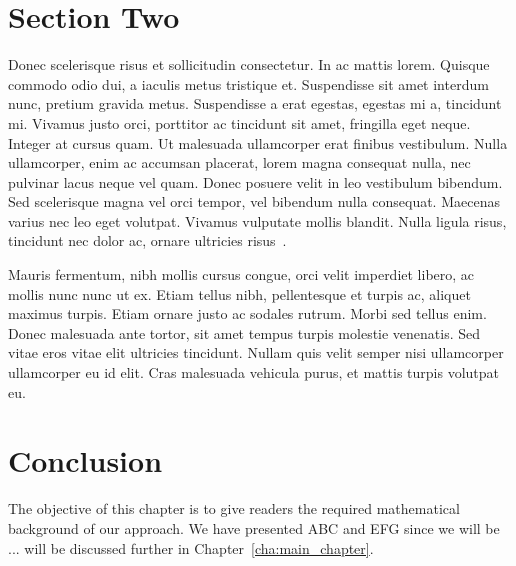 
\section{Section Two}
\label{sec:section_two}

Donec scelerisque risus et sollicitudin consectetur. In ac mattis lorem. Quisque commodo odio dui, a iaculis metus tristique et. Suspendisse sit amet interdum nunc, pretium gravida metus. Suspendisse a erat egestas, egestas mi a, tincidunt mi. Vivamus justo orci, porttitor ac tincidunt sit amet, fringilla eget neque. Integer at cursus quam. Ut malesuada ullamcorper erat finibus vestibulum. Nulla ullamcorper, enim ac accumsan placerat, lorem magna consequat nulla, nec pulvinar lacus neque vel quam. Donec posuere velit in leo vestibulum bibendum. Sed scelerisque magna vel orci tempor, vel bibendum nulla consequat. Maecenas varius nec leo eget volutpat. Vivamus vulputate mollis blandit. Nulla ligula risus, tincidunt nec dolor ac, ornare ultricies risus~\cite{Schmidt1993aa}. \newline

Mauris fermentum, nibh mollis cursus congue, orci velit imperdiet libero, ac mollis nunc nunc ut ex. Etiam tellus nibh, pellentesque et turpis ac, aliquet maximus turpis. Etiam ornare justo ac sodales rutrum. Morbi sed tellus enim. Donec malesuada ante tortor, sit amet tempus turpis molestie venenatis. Sed vitae eros vitae elit ultricies tincidunt. Nullam quis velit semper nisi ullamcorper ullamcorper eu id elit. Cras malesuada vehicula purus, et mattis turpis volutpat eu.



\section{Conclusion}
\label{sec:background_conclusion}

The objective of this chapter is to give readers the required mathematical background of our approach. We have presented ABC and EFG since we will be ...  will be discussed further in Chapter~\ref{cha:main_chapter}.

